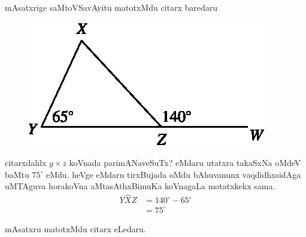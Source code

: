 mAsatxrige saMtoVSavAyitu matotxMdu citarx baredaru
\begin{figure}[H]
\centering
\includegraphics{src/figures/m_179c.eps}
\end{figure}
citarxdalilx $y\times z$ koVnada parimANaveSuTx? eMdaru utatxra takaSxNa oMdeV baMtu $75^\circ$ eMdu. heVge eMdaru tirxBujada oMdu bAhuvanunx vaqdidhxsidAga uMTAguva horakoVna aMtasAthxBimuKa koVnagaLa motatxkekx sama. 
\begin{align*}
Y\hat{X}Z &=140^\circ-65^\circ\\
&=75^\circ
\end{align*}

mAsatxru matotxMdu citarx eLedaru.

